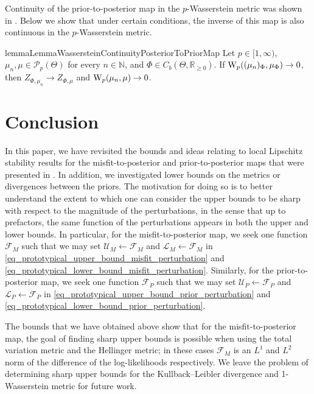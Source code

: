 \documentclass[a4paper]{scrartcl}
\theoremstyle{definition}
\numberwithin{equation}{section}
\newcommand{\R}{\mathbb{R}}
\newcommand{\N}{\mathbb{N}}
\newcommand{\Was}[0]{\textup{W}}
\begin{document}
Continuity of the prior-to-posterior map in the $p$-Wasserstein metric was shown in \cite[Lemma 16]{Sprungk2020}. Below we show that under certain conditions, the inverse of this map is also continuous in the $p$-Wasserstein metric.
\begin{restatable}{lemma}{LemmaWassersteinContinuityPosteriorToPriorMap}
\label{lemma_Wasserstein_continuity_posterior_to_prior_map}
Let $p\in[1,\infty)$, $\mu_n, \mu \in \mathcal{P}_p(\Theta)$ for every $n\in\N$, and $\Phi\in C_b(\Theta,\R_{\geq 0})$. If $\Was_p((\mu_n)_\Phi,\mu_{\Phi})\to 0$, then $Z_{\Phi,\mu_n}\to Z_{\Phi,\mu}$ and $\Was_p(\mu_n,\mu)\to 0$.
\end{restatable}

\section{Conclusion}
\label{sec_conclusion}

In this paper, we have revisited the bounds and ideas relating to local Lipschitz stability results for the misfit-to-posterior and prior-to-posterior maps that were presented in \cite{Sprungk2020}.
In addition, we investigated lower bounds on the metrics or divergences between the priors. The motivation for doing so is to better understand the extent to which one can consider the upper bounds to be sharp with respect to the magnitude of the perturbations, in the sense that up to prefactors, the same function of the perturbations appears in both the upper and lower bounds.
In particular, for the misfit-to-posterior map, we seek one function $\mathcal{F}_M$ such that we may set $\mathcal{U}_M\leftarrow \mathcal{F}_M$ and $\mathcal{L}_M\leftarrow\mathcal{F}_M$ in \eqref{eq_prototypical_upper_bound_misfit_perturbation} and \eqref{eq_prototypical_lower_bound_misfit_perturbation}.
Similarly, for the prior-to-posterior map, we seek one function $\mathcal{F}_P$ such that we may set $\mathcal{U}_P\leftarrow \mathcal{F}_P$ and $\mathcal{L}_P\leftarrow\mathcal{F}_P$ in \eqref{eq_prototypical_upper_bound_prior_perturbation} and \eqref{eq_prototypical_lower_bound_prior_perturbation}.

The bounds that we have obtained above show that for the misfit-to-posterior map, the goal of finding sharp upper bounds is possible when using the total variation metric and the Hellinger metric; in these cases $\mathcal{F}_M$ is an $L^1$ and $L^2$ norm of the difference of the log-likelihoods respectively. We leave the problem of determining sharp upper bounds for the Kullback--Leibler divergence and 1-Wasserstein metric for future work.
\end{document}
